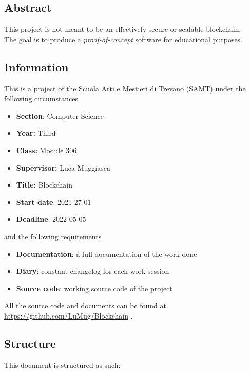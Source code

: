 \documentclass[../documentation.tex]{subfiles}
\begin{document}
\subsection{Abstract}

This project is not meant to be an
effectively secure or scalable blockchain.
\\
The goal is to produce a \textit{proof-of-concept} software for educational purposes.

\subsection{Information}

This is a project of the Scuola Arti e Mestieri di Trevano (SAMT) under the following circumstances

\begin{itemize}
    \item \textbf{Section}: Computer Science
    \item \textbf{Year:} Third
    \item \textbf{Class:} Module 306
    \item \textbf{Supervisor:} Luca Muggiasca
    \item \textbf{Title:} Blockchain
    \item \textbf{Start date}: 2021-27-01
    \item \textbf{Deadline}: 2022-05-05
\end{itemize}

and the following requirements

\begin{itemize}
    \item \textbf{Documentation}: a full documentation of the work done
    \item \textbf{Diary}: constant changelog for each work session
    \item \textbf{Source code}: working source code of the project
\end{itemize}

All the source code and documents can be found at
\href{https://github.com/LuMug/Blockchain}{https://github.com/LuMug/Blockchain}
\cite{gitrepo}.

\subsection{Structure}

This document is structured as such:
\end{document}
